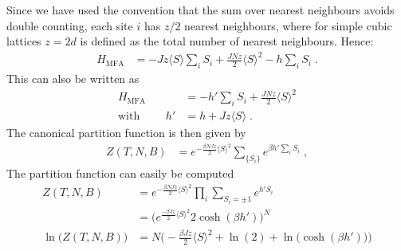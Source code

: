 %
Since we have used the convention that the sum over nearest neighbours avoids
double counting, each site $i$ has $z/2$ nearest neighbours, where for simple cubic lattices $z=2d$ is defined as the total number of nearest neighbours.
Hence:
%
\begin{align*} 
H_\text{MFA} 
&= - J z  \langle S \rangle \sum_{i}  S_{i}
+ \frac{J N z}{2}  \langle S \rangle^{2}
  - h
\sum_{i} S_{i} \;.
\end{align*}
%
%
This can also be written as
\begin{align}\label{eq:ising:H:mfa}
H_\text{MFA} &=
  - h '\sum_{i} S_{i}
+ \frac{J N z}{2}  \langle S \rangle^{2}
 \\
\text{with }\qquad h' &= h + Jz \langle S \rangle\;.
\end{align}
The canonical partition function is then given by
%
\begin{align}\label{eq:ising:mfa:aux1}
Z(T,N,B) &= e^{-\frac{ \beta N J z}{2}\langle S \rangle^{2}} \sum_{\{S_{i}\}} e^{\beta h'\sum_{i}S_{i}}\;,
\end{align}
%
The partition function can easily be computed
%
\begin{align}\label{eq:}
Z(T,N,B) &= e^{-\frac{\beta N J z}{2} \langle S \rangle^{2}}\prod_{i} \sum_{S_{i}=\pm 1} e^{h' S_{i}} \nonumber\\
&= \bigg(  e^{\frac{-\beta J z}{2} \langle S \rangle^{2}}2 \cosh(\beta h') \bigg)^{N}\\
\ln\big( Z(T,N,B)  \big)
&= N \bigg( -\frac{\beta J z}{2} \langle S \rangle^{2} 
+\ln(2) 
+\ln\big( \cosh(\beta h')   \big) 
\bigg)
\label{eq:Z:Ising:MFA}
\end{align}
%
